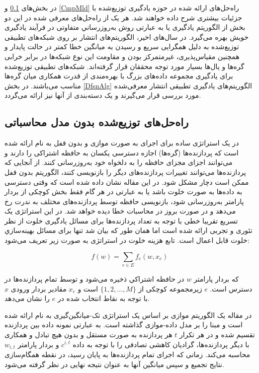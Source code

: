 در بخش‌های \ref{WthCmpMdl} و \ref{CmpMld} راه‌حل‌های ارائه شده در حوزه یادگیری توزیع‌شده با جزئیات بیشتری شرح داده خواهند شد.  هر یک از راه‌حل‌های معرفی شده در این دو بخش از الگوریتم یادگیری یا به عبارتی روش به‌روزرساني متفاوتی در فرآیند یادگیری خویش بهره می‌گیرد. در سال‌های اخیر، الگوریتم‌های انتشار بر روی شبکه‌های تطبیقی توزیع‌شده به دلیل همگرایی سریع و رسیدن به میانگین خطا کمتر در حالت پایدار و همچنین مقیاس‌پذیری، غیرمتمرکز بودن و مقاومت این نوع شبکه‌ها در برابر خرابی گره‌ها و یال‌ها بسیار مورد توجه محققان قرار گرفته‌اند. شبکه‌های تطبیقی توزیع‌شده برای یادگیری مجموعه داده‌های بزرگ با بهره‌مندی از قدرت همکاری میان گره‌ها مناسب می‌باشند. در بخش \ref{DfsnAlg} الگوریتم‌های یادگیری تطبیقی انتشار معرفی‌شده مورد بررسی قرار می‌گیرند و یک دسته‌بندی از آنها نیز ارائه می‌گردد.

\subsection{راه‌حل‌های توزیع‌شده بدون مدل محاسباتی}\label{WthCmpMdl}


در \cite{Hog12011} یک استراتژی ساده برای اجرای  به صورت موازی و بدون قفل به نام  ارائه شده است که پردازنده‌ها (گره‌ها) اجازه دسترسی یکسان به حافظه اشتراکی را دارند و می‌توانند اجزای مجزای حافظه را به دلخواه خود به‌روزرسانی کنند. از آنجایی که پردازنده‌ها می‌توانند تغییرات پردازنده‌های دیگر را بازنویسی کنند، الگوریتم بدون قفل ممکن است دچار مشکل شود. در این مقاله نشان داده شده است که وقتی دسترسی به داده‌ها به صورت خلوت  باشد یا به عبارتی در هر گام فقط بخش کوچکی از بردار پارامتر به‌روزرسانی شود، بازنویسی حافظه توسط پردازنده‌های مختلف به ندرت رخ می‌دهد و در صورت بروز در محاسبات خطا دیده خواهد شد. در این استراتژی یک تسریع تقریبا خطی با توجه به تعداد پردازنده‌ها برای مسائل یادگیری خلوت از نظر تئوری و تجربی ارائه شده است اما همان طور که بیان شد تنها برای مسائل بهينه‌سازي خلوت قابل اعمال است. تابع هزینه خلوت در استراتژی  به صورت زیر تعریف می‌شود:

\begin{equation}\label{e18}
	f(w)=\sum_{e\in E}f_e(w,x_e)
\end{equation}

که بردار پارامتر $w$ در حافظه اشتراكي ذخيره می‌شود و توسط تمام پردازنده‌ها در دسترس است. $e$ زیرمجموعه کوچکی از $\{1, 2, ...,M\}$ است و $x_e$ مقادير بردار ورودی $x$ با توجه به نقاط انتخاب شده در $e$ را نشان می‌دهد.

در مقاله \cite{Zin2010} یک الگوریتم  موازی بر اساس یک استراتژی تک-میانگین‌گیری  به نام  ارائه شده است و مبنا را بر مدل داده-موازی گذاشته است. به عبارتی  نمونه داده بین  پردازنده تقسیم شده و در هر تکرار $t$ هر پردازنده  به صورت مستقل و بدون هیچ تبادل و همکاری با دیگر پردازنده‌ها، گرادیان کاهشی تصادفی را با توجه به داده‌ $c^{i,t}$ و بردار پارامتر $w_{i,t}$ محاسبه می‌کند. زمانی که اجرای تمام پردازنده‌ها به پایان رسید، در نقطه همگام‌سازی نتایج تجمیع و سپس میانگین آنها به عنوان نتیجه نهایی در نظر گرفته می‌شود.

